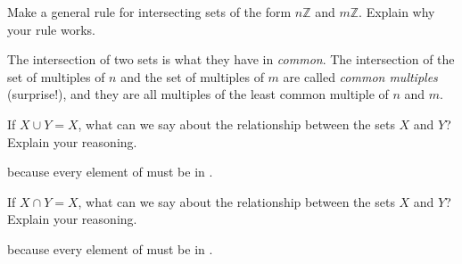 \documentclass[nooutcomes]{ximera}
\renewcommand{\Z}{\mathbb Z}
\begin{document}

\begin{problem}
Make a general rule for intersecting sets of the form $n\mathbb Z$ and
  $m\mathbb Z$. Explain why your rule works.
\begin{freeResponse}
\begin{hint}
The intersection of two sets is what they have in \emph{common}.  The intersection of the set of multiples of $n$ and the set of multiples of $m$ are called \emph{common multiples} (surprise!), and they are all multiples of the least common multiple of $n$ and $m$.  
\end{hint}
\end{freeResponse}
\end{problem}

\begin{problem}
If $X\cup Y = X$, what can we say about the relationship between the sets $X$ and $Y$? Explain your reasoning.

because every element of  must be in .

\end{problem}

\begin{problem}
If $X\cap Y = X$, what can we say about the relationship between the sets $X$ and $Y$? Explain your reasoning.

because every element of  must be in .
\end{problem}
\end{document}
